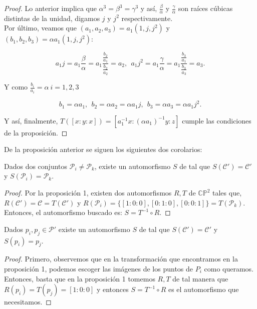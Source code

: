\begin{proof}
Lo anterior implica que $\alpha^{3} = \beta^{3} = \gamma^{3}$ y así, $\frac{\beta}{\alpha}$ y $\frac{\gamma}{\alpha}$ son raíces cúbicas distintas de la unidad, digamos $j$ y $j^{2}$ respectivamente.
\\

Por último, veamos que $(a_{1},a_{2},a_{3}) = a_{1}(1,j,j^{2})$ y $(b_{1},b_{2},b_{3}) = \alpha a_{1}(1,j,j^{2})$:

$$a_{1}j = a_{1}\frac{\beta}{\alpha}=a_{1}\frac{\frac{b_{2}}{a_{1}}}{\frac{b_{2}}{a_{2}}} = a_{2},\ \ a_{1}j^{2} = a_{1}\frac{\gamma}{\alpha} = a_{1}\frac{\frac{b_{3}}{a_{1}}}{\frac{b_{3}}{a_{3}}} = a_{3}.$$

Y como $\frac{b_{i}}{a_{i}} = \alpha \ i=1,2,3$

$$b_{1} = \alpha a_{1},\ \ b_{2} = \alpha a_{2} = \alpha a_{1}j,\ \ b_{3} = \alpha a_{3} = \alpha a_{1}j^{2}.$$ 

Y así, finalmente, $T([x:y:x]) = [a_{1}^{-1}x : (\alpha a_{1})^{-1}y : z ]$ cumple las condiciones de la proposición.

\end{proof}

De la proposición anterior se siguen los siguientes dos corolarios:

\begin{Corolario}
\label{Coro1Prop1}
  Dados dos conjuntos $\mathcal{P}_{i} \neq \mathcal{P}_{k}$, existe un automorfismo $S$ de \CP tal que $S(\mathcal{C'}) = \mathcal{C'}$ y $S(\mathcal{P}_{i}) = \mathcal{P}_{k}$.

\end{Corolario}

\begin{proof}

Por la proposición 1, existen dos automorfismos $R,T$ de $\mathbb{CP^{\mathrm{2}}}$ tales que, $R(\mathcal{C'}) = \mathcal{C} = T(\mathcal{C'})$ y $ R(\mathcal{P}_{i}) = \{ [1:0:0],[0:1:0],[0:0:1] \} = T(\mathcal{P}_{k})$. Entonces, el automorfismo buscado es: $S = T^{-1} \circ R$.

\end{proof}

\begin{Corolario}
\label{Coro2Prop1}
Dados $p_{i}, p_{j} \in \mathcal{P'}$ existe un automorfismo $S$ de \CP tal que $S(\mathcal{C'}) = \mathcal{C'}$ y $S(p_{i}) = p_{j}$. 

\end{Corolario}

\begin{proof}

Primero, observemos que en la transformación que encontramos en la proposición 1, podemos escoger las imágenes de los puntos de $P_{i}$ como queramos. Entonces, basta que en la proposición 1 tomemos $R, T $ de tal manera que $R(p_{i}) = T(p_{j}) = [1:0:0]$ y entonces $S = T^{-1} \circ R$ es el automorfismo que necesitamos.

\end{proof}


